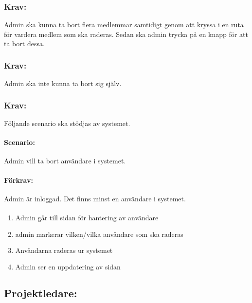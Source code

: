 \documentclass[paper=a4, fontsize=11pt,twoside]{article}
\begin{document}
	\subsubsection{Krav:} Admin ska kunna ta bort flera medlemmar samtidigt genom att kryssa i en ruta för vardera medlem som ska raderas. Sedan ska admin trycka på en knapp för att ta bort dessa.
	\subsubsection{Krav:} Admin ska inte kunna ta bort sig själv.
	
	\subsubsection{Krav:} Följande scenario ska stödjas av systemet. 
	\paragraph{Scenario:}
	Admin vill ta bort användare i systemet.
	\paragraph{Förkrav:}
	Admin är inloggad. Det finns minst en användare i systemet.
	\paragraph{}
	\begin{enumerate}
		\item Admin går till sidan för hantering av användare
		\item admin markerar vilken/vilka användare som ska raderas
		\item Användarna raderas ur systemet
		\item Admin ser en uppdatering av sidan
	\end{enumerate}
	
\subsection{Projektledare:}
\paragraph{}
\end{document}

